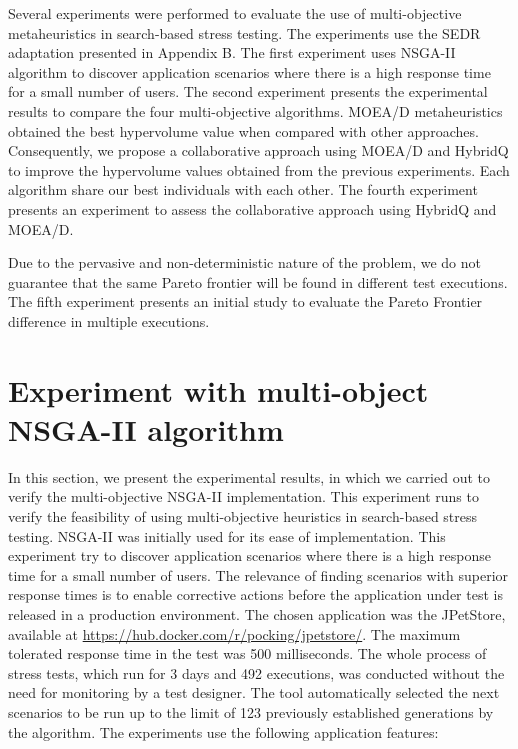 \documentclass[espaco=umemeio,chapter=TITLE,twoside,openright]{abnt}
\begin{document}
Several experiments were performed to evaluate the use of multi-objective metaheuristics in search-based stress testing. The experiments use the SEDR adaptation presented in Appendix B. The first experiment uses NSGA-II algorithm to discover application scenarios where there is a high response time for a small number of users. The second experiment presents the experimental results to compare the four multi-objective algorithms.  MOEA/D metaheuristics obtained the best hypervolume value when compared with other approaches. Consequently, we propose a collaborative approach using MOEA/D and HybridQ to improve the hypervolume values obtained from the previous experiments. Each algorithm share our best individuals with each other. The fourth experiment presents an experiment to assess the collaborative approach using HybridQ and MOEA/D. 

Due to the pervasive and non-deterministic nature of the problem, we do not guarantee that the same Pareto frontier will be found in different test executions. The fifth experiment presents an initial study to evaluate the Pareto Frontier difference in multiple executions. 

\section{Experiment with multi-object NSGA-II algorithm}

In this section,  we present the experimental results,  in which we carried out to verify the multi-objective NSGA-II   implementation. This experiment runs to verify the feasibility of using multi-objective heuristics in search-based stress testing. NSGA-II was initially used for its ease of implementation. This experiment try to discover application scenarios where there is a high response time for a small number of users. The relevance of finding scenarios with superior response times is to enable corrective actions before the application under test is released in a production environment. The chosen application was the JPetStore, available at \url{https://hub.docker.com/r/pocking/jpetstore/}. The maximum tolerated response time in the test was 500 milliseconds.  The whole process of stress  tests, which run for 3 days and 492 executions,  was conducted without the need for monitoring by a test designer. The tool automatically selected the next scenarios to be run up to the limit of 123 previously established  generations by the algorithm. The experiments use the following application features:
\end{document}
